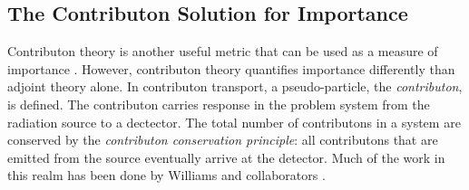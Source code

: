 \subsection{The Contributon Solution for Importance}
\label{sec:ContributonImportance}

Contributon theory is another useful metric that can be used as a measure of
importance
\cite{williams_generalized_1991,williams_contributorn_1992,williams_contributon_study}.
However, contributon theory quantifies importance differently than
adjoint theory alone. In contributon transport, a pseudo-particle, the
\textit{contributon}, is defined. The contributon carries response in the problem
system from the radiation source to a dectector. The
total number of contributons in a system are conserved by the \textit{contributon
conservation principle}: all contributons that are emitted from the source
eventually arrive at the detector. Much of the work in this realm has been done
by Williams and collaborators
\cite{williams_generalized_1991,williams_contributorn_1992,williams_contributon_study}.

